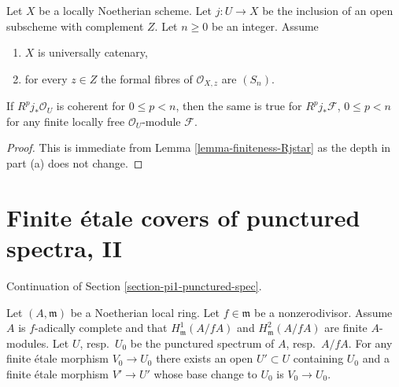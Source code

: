 \begin{lemma}
\label{lemma-finiteness-for-finite-locally-free}
Let $X$ be a locally Noetherian scheme. Let $j : U \to X$ be the inclusion
of an open subscheme with complement $Z$. Let $n \geq 0$ be an integer. Assume
\begin{enumerate}
\item $X$ is universally catenary,
\item for every $z \in Z$ the formal fibres of
$\mathcal{O}_{X, z}$ are $(S_n)$.
\end{enumerate}
If $R^pj_*\mathcal{O}_U$ is coherent for $0 \leq p < n$, then
the same is true for $R^pj_*\mathcal{F}$, $0 \leq p < n$
for any finite locally free $\mathcal{O}_U$-module $\mathcal{F}$.
\end{lemma}

\begin{proof}
This is immediate from Lemma \ref{lemma-finiteness-Rjstar}
as the depth in part (a) does not change.
\end{proof}














\section{Finite \'etale covers of punctured spectra, II}
\label{section-pi1-punctured-spec-II}

\noindent
Continuation of Section \ref{section-pi1-punctured-spec}.

\begin{lemma}
\label{lemma-essentially-surjective-general}
Let $(A, \mathfrak m)$ be a Noetherian local ring. Let $f \in \mathfrak m$ be a
nonzerodivisor. Assume $A$ is $f$-adically complete and that
$H^1_\mathfrak m(A/fA)$ and $H^2_\mathfrak m(A/fA)$
are finite $A$-modules. Let $U$, resp.\ $U_0$ be the punctured spectrum of
$A$, resp.\ $A/fA$. For any finite \'etale morphism $V_0 \to U_0$ there
exists an open $U' \subset U$ containing $U_0$ and a finite \'etale morphism
$V' \to U'$ whose base change to $U_0$ is $V_0 \to U_0$.
\end{lemma}

